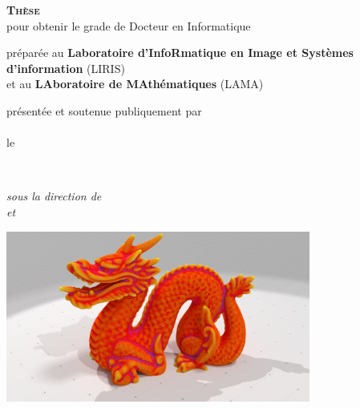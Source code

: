 \begin{titlepage}
	\begin{addmargin}[-3.5cm]{-3cm}
    \begin{center}
        \large

        \hfill

        \textsc{\Large\textbf{Thèse}}\\
        pour obtenir le grade de {Docteur} en {Informatique} \\ \bigskip



        préparée au \textbf{\normalsize Laboratoire d'InfoRmatique en Image et Systèmes d'information} (LIRIS)\\%
        et au \textbf{\normalsize LAboratoire de MAthématiques} (LAMA)\\ \medskip %


        présentée et soutenue publiquement par \\
        \textsc{\Large\textbf{\sayMyName}} \\
        le \textsc{\thesisDate}

        \vfill

        \begingroup
            \color{Maroon}\huge{\textsc{\thesisTitle}} \\ %
        \endgroup




        \textit{sous la direction de \\
        \textbf{\thesisFirstSupervisor} et \textbf{\thesisSecondSupervisor}} \\ %

				\vfill

				\includegraphics[width=10cm]{images/Teaser}



\end{center}
\end{addmargin}
\end{titlepage}
